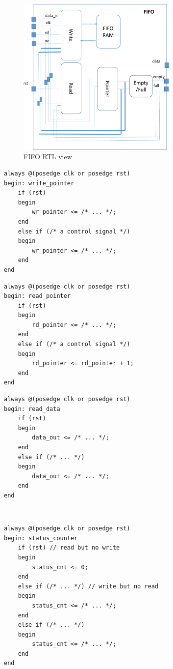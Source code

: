 \documentclass[12pt, logo=tehranDLDL/ut]{tehranDLDL}
\begin{document}
\begin{figure}
    \centering
    \caption{FIFO RTL view\label{fig:fifo-rtl}}
    \includegraphics[width=0.7\textwidth]{fifo-rtl}
\end{figure}

\begin{multicols}{2}
\begin{lstlisting}[caption={\lstinline{write_pointer} \lstinline{always} block\label{lst:write_pointer}}]
always @(posedge clk or posedge rst)
begin: write_pointer
    if (rst)
    begin
        wr_pointer <= /* ... */;
    end
    else if (/* a control signal */)
    begin
        wr_pointer <= /* ... */;
    end
end
\end{lstlisting}
\vfill\null
\begin{lstlisting}[caption={\lstinline{read_pointer} \lstinline{always} block\label{lst:read_pointer}}]
always @(posedge clk or posedge rst)
begin: read_pointer
    if (rst)
    begin
        rd_pointer <= /* ... */;
    end
    else if (/* a control signal */)
    begin
        rd_pointer <= rd_pointer + 1;
    end
end
\end{lstlisting}
\end{multicols}

\begin{multicols}{2}
\begin{lstlisting}[caption={\lstinline{read_data} \lstinline{always} block\label{lst:read_data}}]
always @(posedge clk or posedge rst)
begin: read_data
    if (rst)
    begin
        data_out <= /* ... */;
    end
    else if (/* ... */)
    begin
        data_out <= /* ... */;
    end
end
\end{lstlisting}
~\\
\vfill\null
\begin{lstlisting}[caption={\lstinline{status_counter} \lstinline{always} block\label{lst:status_counter}}]
always @(posedge clk or posedge rst)
begin: status_counter
    if (rst) // read but no write
    begin
        status_cnt <= 0;
    end
    else if (/* ... */) // write but no read
    begin
        status_cnt <= /* ... */;
    end
    else if (/* ... */)
    begin
        status_cnt <= /* ... */;
    end
end
\end{lstlisting}
\end{multicols}
\end{document}
